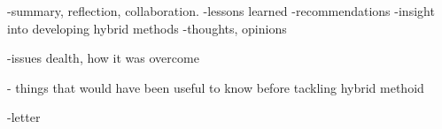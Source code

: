 



-summary, reflection, collaboration.
-lessons learned
-recommendations
-insight into developing hybrid methods
-thoughts, opinions

-issues dealth, how it was overcome

- things that would have been useful to know before tackling hybrid methoid


-letter